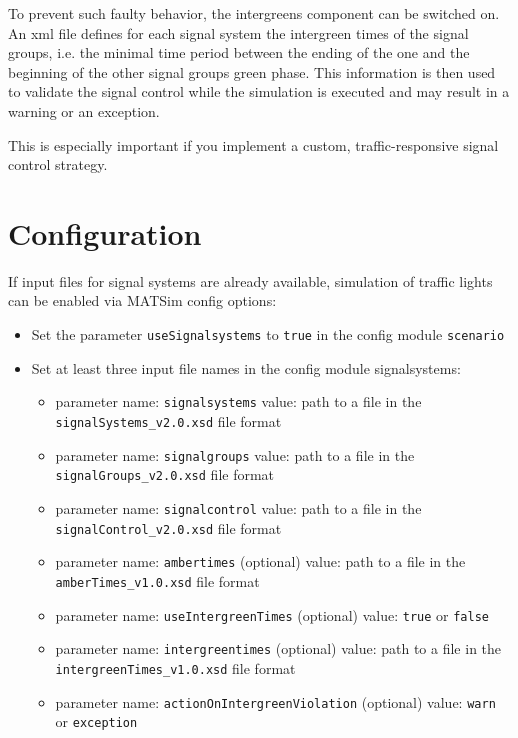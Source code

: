To prevent such faulty behavior, the intergreens component can be switched on. 
An xml file defines for each signal system the intergreen times of the signal groups, i.e. the minimal time period between the ending of the one and the beginning of the other signal groups green phase. 
This information is then used to validate the signal control while the simulation is executed and may result in a warning or an exception. 

This is especially important if you implement a custom, traffic-responsive signal control strategy.  


\section{Configuration}
\label{sec:signals_configuration}

If input files for signal systems are already available, simulation of traffic lights can be enabled via MATSim config options:

\begin{itemize}
	\item Set the parameter \lstinline$useSignalsystems$ to \lstinline$true$ in the config module \lstinline$scenario$
	\item Set at least three input file names in the config module signalsystems:
		\begin{itemize}
			\item parameter name: \lstinline$signalsystems$ value: path to a file in the \lstinline$signalSystems_v2.0.xsd$ file format
  		\item parameter name: \lstinline$signalgroups$ value: path to a file in the \lstinline$signalGroups_v2.0.xsd$ file format
 			\item parameter name: \lstinline$signalcontrol$ value: path to a file in the \lstinline$signalControl_v2.0.xsd$ file format
 			\item parameter name: \lstinline$ambertimes$ (optional) value: path to a file in the \lstinline$amberTimes_v1.0.xsd$ file format
			\item parameter name: \lstinline$useIntergreenTimes$ (optional) value: \lstinline$true$ or \lstinline$false$
			\item parameter name: \lstinline$intergreentimes$ (optional) value: path to a file in the \lstinline$intergreenTimes_v1.0.xsd$ file format
			\item parameter name: \lstinline$actionOnIntergreenViolation$ (optional) value: \lstinline$warn$ or \lstinline$exception$
		\end{itemize}
\end{itemize}

